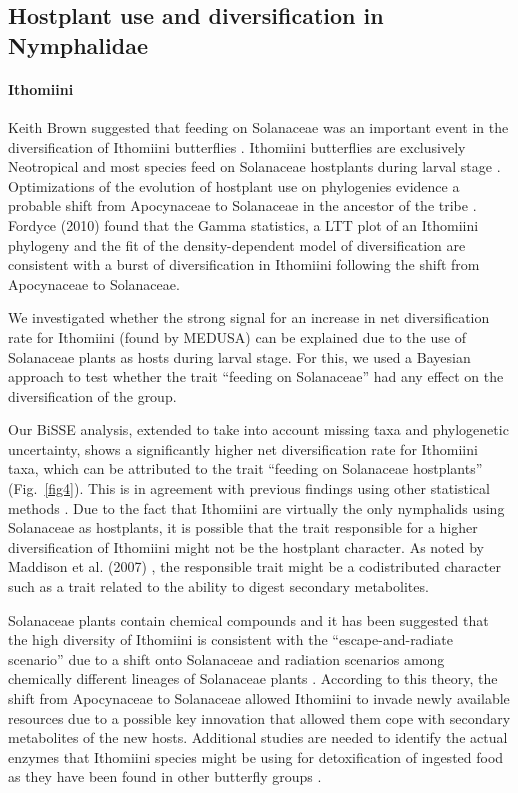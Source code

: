 \documentclass[10pt,letterpaper]{article}
\begin{document}
\subsection*{Hostplant use and diversification in Nymphalidae}

\paragraph*{Ithomiini}

Keith Brown suggested that feeding on Solanaceae was an important event
in the diversification of Ithomiini butterflies \cite{brown1987}. Ithomiini
butterflies are exclusively Neotropical and most species feed on
Solanaceae hostplants during larval stage \cite{willmott2006}. Optimizations of the
evolution of hostplant use on phylogenies evidence a probable shift from
Apocynaceae to Solanaceae in the ancestor of the tribe \cite{willmott2006, brower2006}.
Fordyce (2010) \cite{fordyce2010} found that the Gamma statistics, a LTT plot of
an Ithomiini phylogeny and the fit of the density-dependent model of
diversification are consistent with a burst of diversification in
Ithomiini following the shift from Apocynaceae to Solanaceae.

We investigated whether the strong signal for an increase in net
diversification rate for Ithomiini (found by MEDUSA) can be explained
due to the use of Solanaceae plants as hosts during larval stage. For
this, we used a Bayesian approach \cite{fitzjohn2009} to test whether the trait
``feeding on Solanaceae'' had any effect on the diversification of the
group.

Our BiSSE analysis, extended to take into account missing taxa and
phylogenetic uncertainty, shows a significantly higher net
diversification rate for Ithomiini taxa, which can be attributed to the
trait ``feeding on Solanaceae hostplants'' (Fig.~\ref{fig4}). This is in
agreement with previous findings using other statistical methods
\cite{fordyce2010}. Due to the fact that Ithomiini are virtually the only
nymphalids using Solanaceae as hostplants, it is possible that the trait
responsible for a higher diversification of Ithomiini might not be the
hostplant character. As noted by Maddison et al. (2007) \cite{maddison2007}, the
responsible trait might be a codistributed character such as a trait
related to the ability to digest secondary metabolites.

Solanaceae plants contain chemical compounds and it has been suggested
that the high diversity of Ithomiini is consistent with the
``escape-and-radiate scenario'' due to a shift onto Solanaceae
\cite{fordyce2010}
and radiation scenarios among chemically different lineages of
Solanaceae plants \cite{willmott2006, brown1987}. According to this theory, the shift from
Apocynaceae to Solanaceae allowed Ithomiini to invade newly available
resources due to a possible key innovation that allowed them cope with
secondary metabolites of the new hosts. Additional studies are needed to
identify the actual enzymes that Ithomiini species might be using for
detoxification of ingested food as they have been found in other
butterfly groups \cite{wheat2007}.
\end{document}
